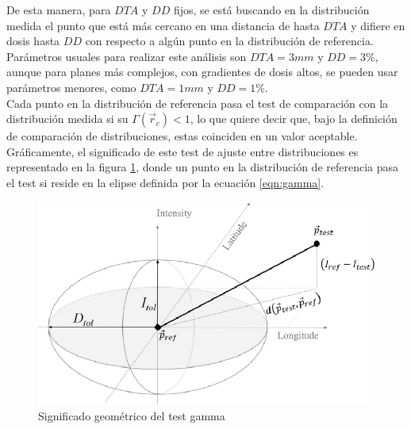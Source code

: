 De esta manera, para $DTA$ y $DD$ fijos, se está buscando en la distribución medida el punto que está más cercano en una distancia de hasta $DTA$ y difiere en dosis hasta $DD$ con respecto a algún punto en la distribución de referencia. Parámetros usuales para realizar este análisis son $DTA=3 mm$ y $DD=3\%$, aunque para planes más complejos, con gradientes de dosis altos, se pueden usar parámetros menores, como $DTA=1 mm$ y $DD=1\%$.\\

Cada punto en la distribución de referencia pasa el test de comparación con la distribución medida si su $\Gamma(\vec{r}_c)<1$, lo que quiere decir que, bajo la definición de comparación de distribuciones, estas coinciden en un valor aceptable. Gráficamente, el significado de este test de ajuste entre distribuciones es representado en la figura \ref{fig:elipseGamma}, donde un punto en la distribución de referencia pasa el test si reside en la elipse  definida por la ecuación \eqref{eqn:gamma}.\\
\begin{figure}[H]
	\centering
	\includegraphics[width=0.5\linewidth]{images/gammaEllipse.png}
	\caption{Significado geométrico del test gamma }
	\label{fig:elipseGamma}
\end{figure}





